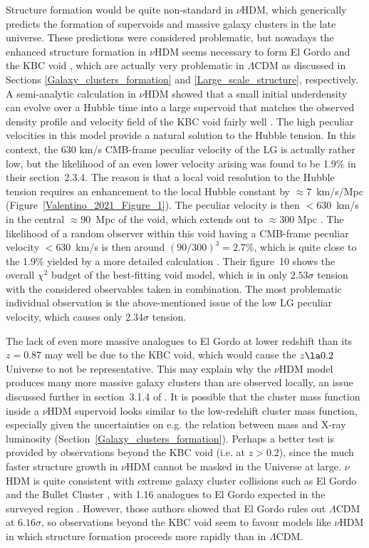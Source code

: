 \documentclass[fleqn,usenatbib,useAMS,onecolumn]{mnras} %
\begin{document}
Structure formation would be quite non-standard in $\nu$HDM, which generically predicts the formation of supervoids \citep{Angus_Diaferio_2011} and massive galaxy clusters \citep{Angus_2013} in the late universe. These predictions were considered problematic, but nowadays the enhanced structure formation in $\nu$HDM seems necessary to form El Gordo \citep{Asencio_2021} and the KBC void \citep{Haslbauer_2020}, which are actually very problematic in $\Lambda$CDM as discussed in Sections \ref{Galaxy_clusters_formation} and \ref{Large_scale_structure}, respectively. A semi-analytic calculation in $\nu$HDM showed that a small initial underdensity can evolve over a Hubble time into a large supervoid that matches the observed density profile and velocity field of the KBC void fairly well \citep{Haslbauer_2020}. The high peculiar velocities in this model provide a natural solution to the Hubble tension. In this context, the 630 km/s CMB-frame peculiar velocity of the LG is actually rather low, but the likelihood of an even lower velocity arising was found to be 1.9\% in their section~2.3.4. The reason is that a local void resolution to the Hubble tension requires an enhancement to the local Hubble constant by $\approx 7$~km/s/Mpc (Figure~\ref{Valentino_2021_Figure_1}). The peculiar velocity is then $<630$~km/s in the central $\approx 90$~Mpc of the void, which extends out to $\approx 300$ Mpc \citep{Keenan_2013}. The likelihood of a random observer within this void having a CMB-frame peculiar velocity $<630$~km/s is then around $\left(90/300\right)^3 = 2.7\%$, which is quite close to the 1.9\% yielded by a more detailed calculation \citep{Haslbauer_2020}. Their figure~10 shows the overall $\chi^2$ budget of the best-fitting void model, which is in only $2.53\sigma$ tension with the considered observables taken in combination. The most problematic individual observation is the above-mentioned issue of the low LG peculiar velocity, which causes only $2.34\sigma$ tension.

The lack of even more massive analogues to El Gordo at lower redshift than its $z = 0.87$ \citep{Menanteau_2012} may well be due to the KBC void, which would cause the $z \la 0.2$ Universe to not be representative. This may explain why the $\nu$HDM model produces many more massive galaxy clusters than are observed locally, an issue discussed further in section~3.1.4 of \citet{Haslbauer_2020}. It is possible that the cluster mass function inside a $\nu$HDM supervoid looks similar to the low-redshift cluster mass function, especially given the uncertainties on e.g. the relation between mass and X-ray luminosity (Section~\ref{Galaxy_clusters_formation}). Perhaps a better test is provided by observations beyond the KBC void (i.e. at $z > 0.2$), since the much faster structure growth in $\nu$HDM cannot be masked in the Universe at large. $\nu$HDM is quite consistent with extreme galaxy cluster collisions such as El Gordo and the Bullet Cluster \citep{Katz_2013}, with 1.16 analogues to El Gordo expected in the surveyed region \citep{Asencio_2021}. However, those authors showed that El Gordo rules out $\Lambda$CDM at $6.16\sigma$, so observations beyond the KBC void seem to favour models like $\nu$HDM in which structure formation proceeds more rapidly than in $\Lambda$CDM.
\end{document}
